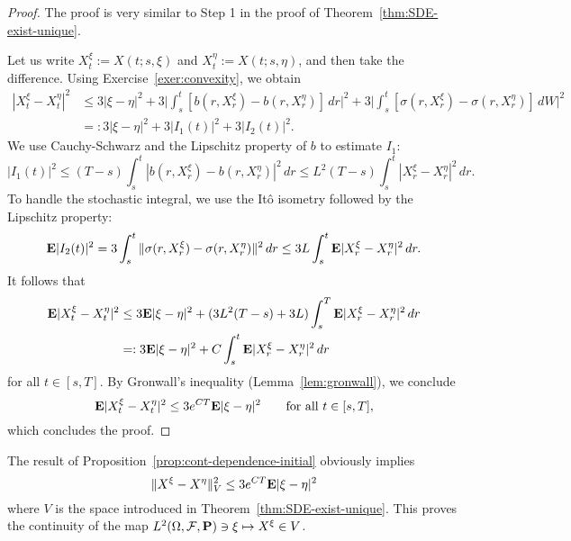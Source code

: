 \begin{proof}
	The proof is very similar to Step 1 in the proof of Theorem~\ref{thm:SDE-exist-unique}.
	
	Let us write $X_t^\xi := X(t;s,\xi)$ and $X_t^\eta := X(t;s,\eta)$, and then take the difference. Using Exercise~\ref{exer:convexity}, we obtain
	\begin{align*}
		|X_t^\xi-X_t^\eta|^2 &\le 3|\xi-\eta|^2 + 3\bigg|\int_s^t [b(r,X_r^\xi)-b(r,X_r^\eta)]\,dr\bigg|^2 + 3\bigg|\int_s^t [\sigma(r,X_r^\xi)-\sigma(r,X_r^\eta)]\,dW\bigg|^2 \\
		&=: 3|\xi-\eta|^2 + 3|I_1(t)|^2 + 3|I_2(t)|^2.
	\end{align*}
	We use Cauchy-Schwarz and the Lipschitz property of $b$ to estimate $I_1$:
	\begin{equation*}
		|I_1(t)|^2 \le (T-s)\int_s^t |b(r,X_r^\xi)-b(r,X_r^\eta)|^2\,dr \le L^2(T-s)\int_s^t |X_r^\xi-X_r^\eta|^2\,dr.
	\end{equation*}
	To handle the stochastic integral, we use the It\^{o} isometry followed by the Lipschitz property:
	\begin{equation*}
		\mathbf{E}|I_2(t)|^2 = 3\int_s^t \|\sigma(r,X_r^\xi)-\sigma(r,X_r^\eta)\|^2\,dr \le 3L\int_s^t \mathbf{E}|X_r^\xi - X_r^\eta|^2\,dr.
	\end{equation*}
	It follows that
	\begin{align*}
		\mathbf{E}|X_t^\xi - X_t^\eta|^2 &\le 3\mathbf{E}|\xi-\eta|^2 + (3L^2(T-s)+3L)\int_s^T \mathbf{E}|X_r^\xi - X_r^\eta|^2\,dr \\
		&=: 3\mathbf{E}|\xi-\eta|^2 + C\int_s^t \mathbf{E}|X_r^\xi - X_r^\eta|^2\,dr
	\end{align*}
	for all $t\in [s,T]$. By Gronwall's inequality (Lemma~\ref{lem:gronwall}), we conclude
	\begin{equation*}
		\mathbf{E}|X_t^\xi - X_t^\eta|^2 \le 3e^{CT} \mathbf{E}|\xi-\eta|^2 \qquad\text{for all }t\in [s,T],
	\end{equation*}
	which concludes the proof.
\end{proof}

The result of Proposition~\ref{prop:cont-dependence-initial} obviously implies
\begin{equation*}
	\|X^\xi - X^\eta\|^2_V \le 3e^{CT}\mathbf{E}|\xi-\eta|^2
\end{equation*}
where $V$ is the space introduced in Theorem~\ref{thm:SDE-exist-unique}. This proves the continuity of the map $L^2(\Omega,\mathcal{F},\mathbf{P})\ni\xi\mapsto X^\xi \in V$.

